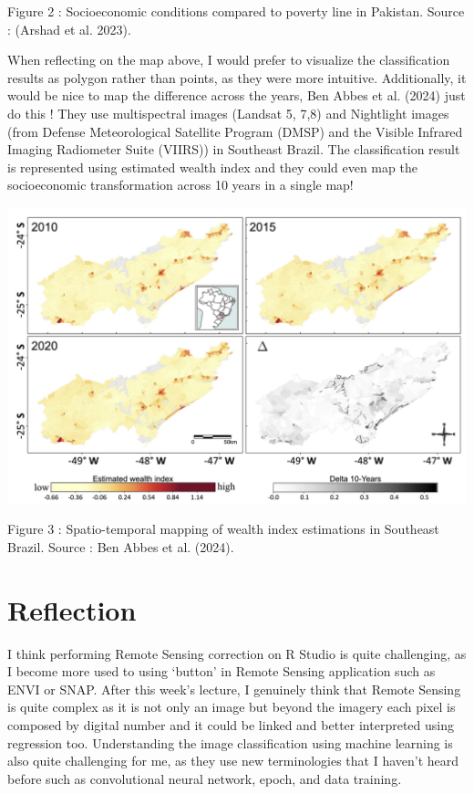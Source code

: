 \documentclass[
  letterpaper,
  DIV=11,
  numbers=noendperiod]{scrreprt}
\begin{document}
Figure 2 : Socioeconomic conditions compared to poverty line in
Pakistan. Source : (Arshad et al. 2023).

When reflecting on the map above, I would prefer to visualize the
classification results as polygon rather than points, as they were more
intuitive. Additionally, it would be nice to map the difference across
the years, Ben Abbes et al. (2024) just do this ! They use multispectral
images (Landsat 5, 7,8) and Nightlight images (from Defense
Meteorological Satellite Program (DMSP) and the Visible Infrared Imaging
Radiometer Suite (VIIRS)) in Southeast Brazil. The classification result
is represented using estimated wealth index and they could even map the
socioeconomic transformation across 10 years in a single map!

\includegraphics[width=6.03125in,height=\textheight]{images/clipboard-422155352.png}

Figure 3 : Spatio-temporal mapping of wealth index estimations in
Southeast Brazil. Source : Ben Abbes et al. (2024).

\hypertarget{reflection-1}{%
\section{Reflection}\label{reflection-1}}

I think performing Remote Sensing correction on R Studio is quite
challenging, as I become more used to using `button' in Remote Sensing
application such as ENVI or SNAP. After this week's lecture, I genuinely
think that Remote Sensing is quite complex as it is not only an image
but beyond the imagery each pixel is composed by digital number and it
could be linked and better interpreted using regression too.
Understanding the image classification using machine learning is also
quite challenging for me, as they use new terminologies that I haven't
heard before such as convolutional neural network, epoch, and data
training.
\end{document}
